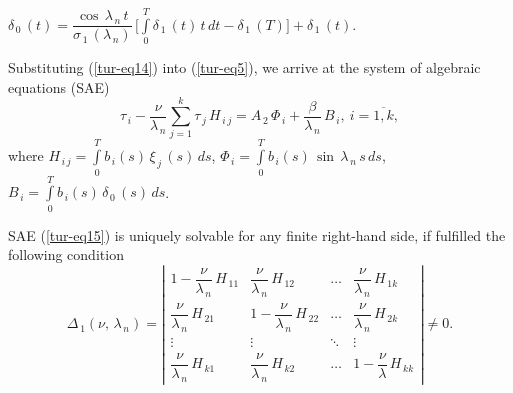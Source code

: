 ﻿\documentclass[
11pt,%
tightenlines,%
twoside,%
onecolumn,%
nofloats,%
nobibnotes,%
nofootinbib,%
superscriptaddress,%
noshowpacs,%
centertags]%
{revtex4}
\begin{document}
$\delta_{\, 0} \, (t)=\dfrac{\cos \, \lambda_{\, n} \, t}{\sigma_{\, 1} \, (\lambda_{\, n})} \, \bigg[ \int \limits_{0}^T \delta_{\, 1} \, (t) \, t \, d t-\delta_{\, 1} \, (T) \bigg]+\delta_{\, 1} \, (t)$.

	Substituting (\ref{tur-eq14}) into (\ref{tur-eq5}), we arrive at the system of algebraic equations (SAE) 
\begin{equation} \label{tur-eq15}	
\tau_{\, i}-\dfrac{\nu}{\lambda_{\, n}} \sum \limits_{j=1}^{k} \tau_{\, j} \, H_{\, i \, j}=A_{\, 2} \, 
\Phi_{\, i}+\dfrac{\beta}{\lambda_{\, n}} \, B_{\, i} , \: i=\overline{1 , k} ,
\end{equation}
where $H_{\, i \, j}=\int \limits_{0}^{T} b_{\, i} (s) \, \xi_{\, j} \, (s) \, d s$,
$\Phi_{\, i}=\int \limits_{0}^{T}  b_{\, i} (s) \, \sin \, \lambda_{\, n} \, s \, d s $,
$B_{\, i}=\int \limits_{0}^{T}  b_{\, i} (s) \, \delta_{\, 0} \, (s) \, d s $.
     
SAE (\ref{tur-eq15}) is uniquely solvable for any finite right-hand side,  if fulfilled the following condition
\begin {equation}\label{tur-eq16}
\Delta_{\, 1} (\nu , \, \lambda_{\, n})=\left| \begin{array}{cccc}
1-\dfrac{\nu}{\lambda_{\, n}} \, H_{\, 11 } & \dfrac{\nu}{\lambda_{\, n}} \, H_{\, 12 }& \ldots & \dfrac{\nu}{\lambda_{\, n}} \, H_{\, 1 k } \\
\dfrac{\nu}{\lambda_{\, n}} \, H_{\, 21 } & 1-\dfrac{\nu}{\lambda_{\, n}} \, H_{\, 22 } &  \ldots & \dfrac{\nu}{\lambda_{\, n}} \, H_{\, 2 k } \\
\vdots &  \vdots &  \ddots & \vdots \\
\dfrac{\nu}{\lambda_{\, n}} \, H_{\, k 1 } & \dfrac{\nu}{\lambda_{\, n}} \, H_{\, k 2 } &   \ldots  & 1-\dfrac{\nu}{\lambda} \, H_{\, k k }
\end{array} \right| \ne 0 .
\end{equation}	
             
\end{document}
